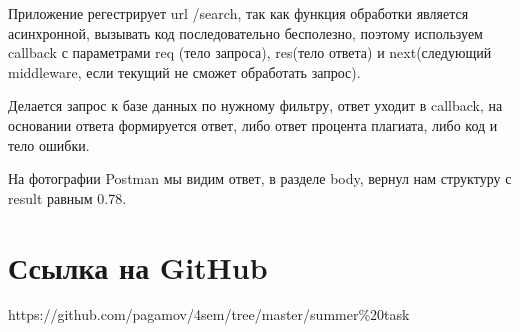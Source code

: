 Приложение регестрирует url /search, так как функция обработки является асинхронной, вызывать код последовательно бесполезно, поэтому используем callback с параметрами req (тело запроса), res(тело ответа) и next(следующий middleware, если текущий не сможет обработать запрос).

Делается запрос к базе данных по нужному фильтру, ответ уходит в callback, на основании ответа формируется ответ, либо ответ процента плагиата, либо код и тело ошибки.

На фотографии Postman мы видим ответ, в разделе body, вернул нам структуру с result равным 0.78.




\section*{Ссылка на GitHub}

https://github.com/pagamov/4sem/tree/master/summer\%20task

\pagebreak